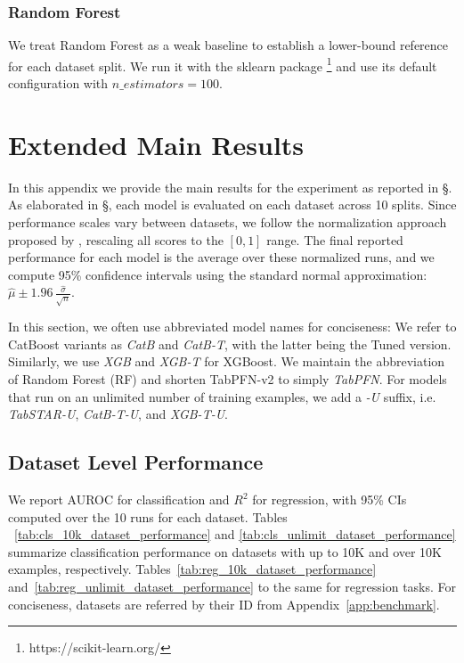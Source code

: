 \subsubsection{Random Forest}

We treat Random Forest as a weak baseline to establish a lower-bound reference for each dataset split. We run it with the sklearn package \footnote{https://scikit-learn.org/} and use its default configuration with $n\_estimators=100$.



\section{Extended Main Results}
\label{app:results}

In this appendix we provide the main results for the experiment as reported in \S{}. As elaborated in \S{}, each model is evaluated on each dataset across 10 splits. Since performance scales vary between datasets, we follow the normalization approach proposed by \cite{hollmann_accurate_2025}, rescaling all scores to the $[0, 1]$ range. The final reported performance for each model is the average over these normalized runs, and we compute 95\% confidence intervals using the standard normal approximation: $\displaystyle \hat{\mu} \pm 1.96\,\frac{\hat{\sigma}}{\sqrt{n}}$. 

In this section, we often use abbreviated model names for conciseness: We refer to CatBoost variants as \textit{CatB} and \textit{CatB-T}, with the latter being the Tuned version. Similarly, we use \textit{XGB} and \textit{XGB-T} for XGBoost. We maintain the abbreviation of Random Forest (RF) and shorten TabPFN-v2 to simply \textit{TabPFN}. For models that run on an unlimited number of training examples, we add a \textit{-U} suffix, i.e. \textit{TabSTAR-U}, \textit{CatB-T-U}, and \textit{XGB-T-U}.


\subsection{Dataset Level Performance}
\label{app:res:dataset_lavel}

We report AUROC for classification and $R^2$ for regression, with 95\% CIs computed over the 10 runs for each dataset. Tables ~\ref{tab:cls_10k_dataset_performance} and \ref{tab:cls_unlimit_dataset_performance} summarize classification performance on datasets with up to 10K and over 10K examples, respectively. Tables~\ref{tab:reg_10k_dataset_performance} and~\ref{tab:reg_unlimit_dataset_performance} to the same for regression tasks. For conciseness, datasets are referred by their ID from Appendix~\ref{app:benchmark}.


